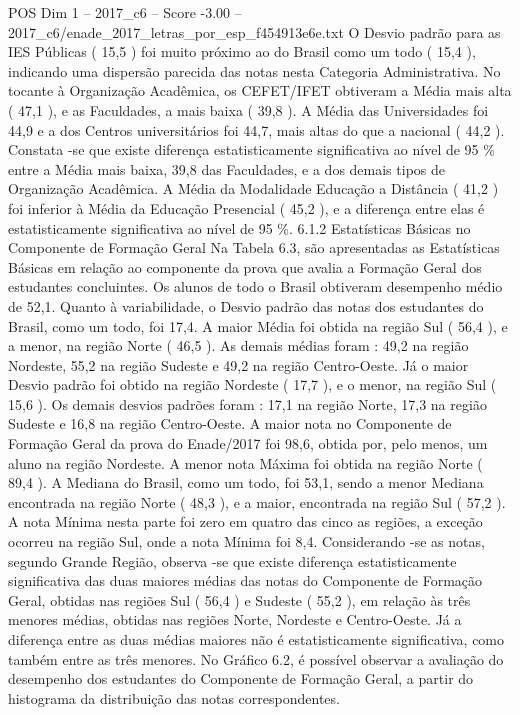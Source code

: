 \begin{textsample}{POS Dim 1 – 2017\_c6 – Score -3.00 – 2017\_c6/enade\_2017\_letras\_por\_esp\_f454913e6e.txt}
O Desvio padrão para as IES Públicas ( 15,5 ) foi muito próximo ao do Brasil como um todo ( 15,4 ), indicando uma dispersão parecida das notas nesta Categoria Administrativa.
No tocante à Organização Acadêmica, os CEFET/IFET obtiveram a Média mais alta ( 47,1 ), e as Faculdades, a mais baixa ( 39,8 ).
A Média das Universidades foi 44,9 e a dos Centros universitários foi 44,7, mais altas do que a nacional ( 44,2 ).
Constata -se que existe diferença estatisticamente significativa ao nível de 95 \% entre a Média mais baixa, 39,8 das Faculdades, e a dos demais tipos de Organização Acadêmica.
A Média da Modalidade Educação a Distância ( 41,2 ) foi inferior à Média da Educação Presencial ( 45,2 ), e a diferença entre elas é estatisticamente significativa ao nível de 95 \%. 6.1.2 Estatísticas Básicas no Componente de Formação Geral Na Tabela 6.3, são apresentadas as Estatísticas Básicas em relação ao componente da prova que avalia a Formação Geral dos estudantes concluintes.
Os alunos de todo o Brasil obtiveram desempenho médio de 52,1.
Quanto à variabilidade, o Desvio padrão das notas dos estudantes do Brasil, como um todo, foi 17,4.
A maior Média foi obtida na região Sul ( 56,4 ), e a menor, na região Norte ( 46,5 ).
As demais médias foram : 49,2 na região Nordeste, 55,2 na região Sudeste e 49,2 na região Centro-Oeste.
Já o maior Desvio padrão foi obtido na região Nordeste ( 17,7 ), e o menor, na região Sul ( 15,6 ).
Os demais desvios padrões foram : 17,1 na região Norte, 17,3 na região Sudeste e 16,8 na região Centro-Oeste.
A maior nota no Componente de Formação Geral da prova do Enade/2017 foi 98,6, obtida por, pelo menos, um aluno na região Nordeste.
A menor nota Máxima foi obtida na região Norte ( 89,4 ).
A Mediana do Brasil, como um todo, foi 53,1, sendo a menor Mediana encontrada na região Norte ( 48,3 ), e a maior, encontrada na região Sul ( 57,2 ).
A nota Mínima nesta parte foi zero em quatro das cinco as regiões, a exceção ocorreu na região Sul, onde a nota Mínima foi 8,4.
Considerando -se as notas, segundo Grande Região, observa -se que existe diferença estatisticamente significativa das duas maiores médias das notas do Componente de Formação Geral, obtidas nas regiões Sul ( 56,4 ) e Sudeste ( 55,2 ), em relação às três menores médias, obtidas nas regiões Norte, Nordeste e Centro-Oeste.
Já a diferença entre as duas médias maiores não é estatisticamente significativa, como também entre as três menores.
No Gráfico 6.2, é possível observar a avaliação do desempenho dos estudantes do Componente de Formação Geral, a partir do histograma da distribuição das notas correspondentes.

\end{textsample}
